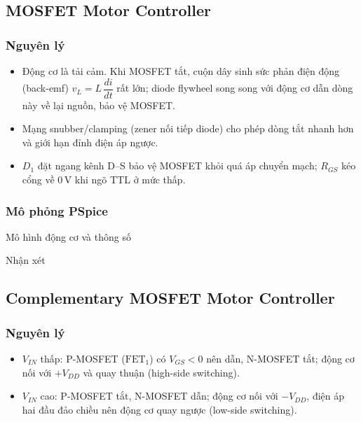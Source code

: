 \subsection{MOSFET Motor Controller \bonus}\label{sec:motor}

\subsubsection*{Nguyên lý}
\begin{itemize}[nosep]
  \item Động cơ là tải cảm. Khi MOSFET tắt, cuộn dây sinh sức phản điện động (back-emf) $v_L = L\,\dfrac{di}{dt}$ rất lớn; diode flywheel song song với động cơ dẫn dòng này về lại nguồn, bảo vệ MOSFET.
  \item Mạng snubber/clamping (zener nối tiếp diode) cho phép dòng tắt nhanh hơn và giới hạn đỉnh điện áp ngược.
  \item $D_1$ đặt ngang kênh D--S bảo vệ MOSFET khỏi quá áp chuyển mạch; $R_{GS}$ kéo cổng về $0\,\text{V}$ khi ngõ TTL ở mức thấp.
\end{itemize}

\subsubsection*{Mô phỏng PSpice}
\begin{notebox}{Mô hình động cơ và thông số}
\end{notebox}
\simresult
{}

\begin{notebox}{Nhận xét}
\end{notebox}

\subsection{Complementary MOSFET Motor Controller \bonus}\label{sec:cmos-motor}

\subsubsection*{Nguyên lý}
\begin{itemize}[nosep]
  \item $V_{IN}$ thấp: P-MOSFET ($\text{FET}_1$) có $V_{GS} < 0$ nên dẫn, N-MOSFET tắt; động cơ nối với $+V_{DD}$ và quay thuận (high-side switching).
  \item $V_{IN}$ cao: P-MOSFET tắt, N-MOSFET dẫn; động cơ nối với $-V_{DD}$, điện áp hai đầu đảo chiều nên động cơ quay ngược (low-side switching).
\end{itemize}

